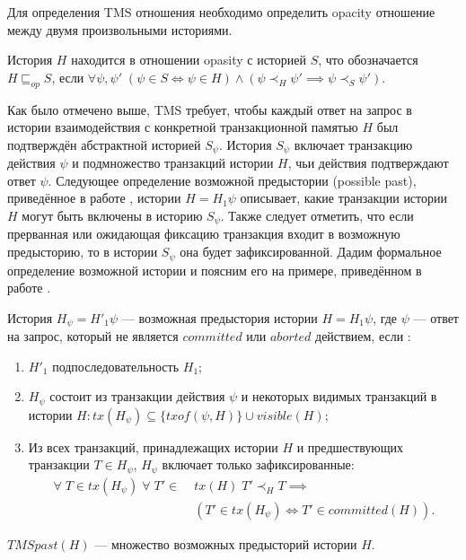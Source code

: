 Для определения TMS отношения необходимо определить opacity отношение между двумя произвольными историями. 

\begin{mydefinition}
История $H$ находится в отношении opasity с историей $S$, что обозначается $H \sqsubseteq_{op} S$, если $\forall \psi, \psi' \; (\psi \in S \iff \psi \in H ) \land (\psi \prec_H \psi' \implies \psi \prec_S \psi' ).$
\end{mydefinition}

Как было отмечено выше, TMS требует, чтобы каждый ответ на запрос в истории взаимодействия с конкретной транзакционной памятью $H$ был подтверждён абстрактной историей $S_{\psi}$. История $S_{\psi}$ включает транзакцию действия $\psi$ и подмножество транзакций истории $H$, чьи действия подтверждают ответ $\psi$. Следующее определение возможной предыстории (possible past), приведённое в работе \cite{tms_article}, истории $H = H_1\psi$ описывает, какие транзакции истории $H$ могут быть включены в историю $S_{\psi}$. Также следует отметить, что если прерванная или ожидающая фиксацию транзакция входит в возможную предысторию, то в истории $S_{\psi}$ она будет зафиксированной. Дадим формальное определение возможной истории и поясним его на примере, приведённом в работе \cite{tms_article}.

\begin{mydefinition}\label{possible_past}
История $H_{\psi} = H'_1\psi$ --- возможная предыстория истории $H = H_1\psi$, где $\psi$ --- ответ на запрос, который не является $committed$ или $aborted$ действием, если :
\begin{enumerate}[label = (\roman*)]
\item $H'_1$ подпоследовательность $H_1$;
\item $H_{\psi}$ состоит из транзакции действия $\psi$ и некоторых видимых транзакций в истории $H: tx(H_{\psi}) \subseteq \{ txof(\psi, H)\} \cup visible(H)$;
\item Из всех транзакций, принадлежащих истории $H$ и предшествующих транзакции $T\in H_{\psi}$, $H_{\psi}$ включает только зафиксированные:
\begin{align*}
\forall \; T \in tx(H_{\psi}) \; \forall \; T' \in \; &tx(H) \; T' \prec_H T \implies \\ &(T' \in tx(H_{\psi}) \iff T' \in committed(H)).
\end{align*}
\end{enumerate}
$TMSpast(H)$ --- множество возможных предысторий истории $H$.
\end{mydefinition}


